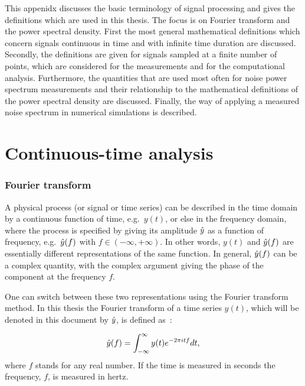 
This appenidx discusses the basic terminology of signal processing and gives the definitions which are used in this thesis. The focus is on Fourier transform and the power spectral density. First the most general mathematical definitions which concern signals continuous in time and with infinite time duration are discussed. Secondly, the definitions are given for signals sampled at a finite number of points, which are considered for the measurements and for the computational analysis. Furthermore, the quantities that are used most often for noise power spectrum measurements and their relationship to the mathematical definitions of the power spectral density are discussed. Finally, the way of applying a measured noise spectrum in numerical simulations is described.

\section{Continuous-time analysis}\label{app:continuous_time_analysis}
\subsubsection*{Fourier transform} %
A physical process (or signal or time series) can be described in the time domain by a continuous function of time, e.g.~$y(t)$, or else in the frequency domain, where the process is specified by giving its amplitude $\hat{y}$ as a function of frequency, e.g.~$\hat{y}(f)$ with $f \in \left(-\infty, +\infty \right )$. In other words, $y(t)$ and $\hat{y}(f)$ are essentially different representations of the same function.  In general, $\hat{y}(f)$ can be a complex quantity, with the complex argument giving the phase of the component at the frequency $f$.

One can switch between these two representations using the Fourier transform method. In this thesis the Fourier transform of a time series $y(t)$, which will be denoted in this document by $\hat{y}$, is defined as~\cite{a_numerical_recipies}: %

\begin{equation}\label{eq:fft_definition}
\hat{y}(f) = \int_{-\infty}^{\infty} y(t) e^{-2\pi {i} t f} dt,
\end{equation}
where $f$ stands for any real number. 
If the time is measured in seconds the frequency, $f$, is measured in hertz. 


